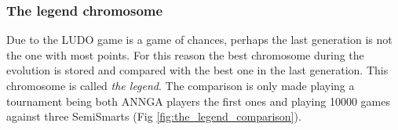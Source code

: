 
		\subsubsection{The legend chromosome} %
		\label{subs:the_legend_chromosome}
		Due to the LUDO game is a game of chances, perhaps the last generation is not the one with most points.
		For this reason the best chromosome during the evolution is stored and compared with the best one in the last generation.
		This chromosome is called \emph{the legend}.
		The comparison is only made playing a tournament being both ANNGA players the first ones and playing 10000 games against three SemiSmarts (Fig \ref{fig:the_legend_comparison}). \\
		
